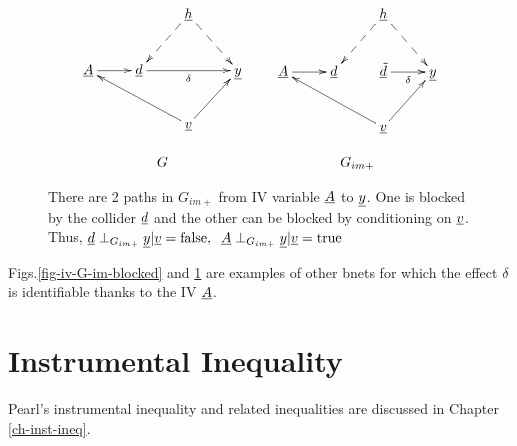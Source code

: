 \begin{figure}[h!]
$$
\begin{array}{ccc}
\xymatrix{
&&\rvh\ar@{-->}[dl]\ar@{-->}[dr]
\\
\rvA\ar[r]
&\rvd\ar[rr]_\delta
&&\rvy
\\
&&\rvv\ar[ur]\ar[ull]
}
&&
\xymatrix{
&&\rvh\ar@{-->}[dl]\ar@{-->}[dr]
\\
\rvA\ar[r]
&\rvd
&
\rvtd\ar[r]_\delta
&\rvy
\\
&&\rvv\ar[ur]\ar[ull]
}
\\
\\
G&&G_{im+}
\end{array}
$$
\caption{
There are 2 paths in $G_{im+}$
from
IV variable ${\underline{A}}$
to ${\underline{y}}$. One is
blocked
by the collider ${\underline{d}}$
and the other
can be blocked by 
conditioning on ${\underline{v}}$. Thus,
$
{\underline{d}}\perp_{G_{im+}} {\underline{y}}|{\underline{v}} =\text{false}, 
\;\; {\underline{A}}\perp_{G_{im+}} {\underline{y}}|{\underline{v}}= \text{true}
$
}
\label{fig-iv-G-im-strata}
\end{figure}

Figs.\ref{fig-iv-G-im-blocked}
and \ref{fig-iv-G-im-strata}
are examples of 
other bnets 
for which the
effect $\delta$
is identifiable
thanks
to the
IV ${\underline{A}}$.


\section*{Instrumental Inequality}
Pearl's instrumental inequality
and related inequalities are discussed in
 Chapter
 \ref{ch-inst-ineq}.


